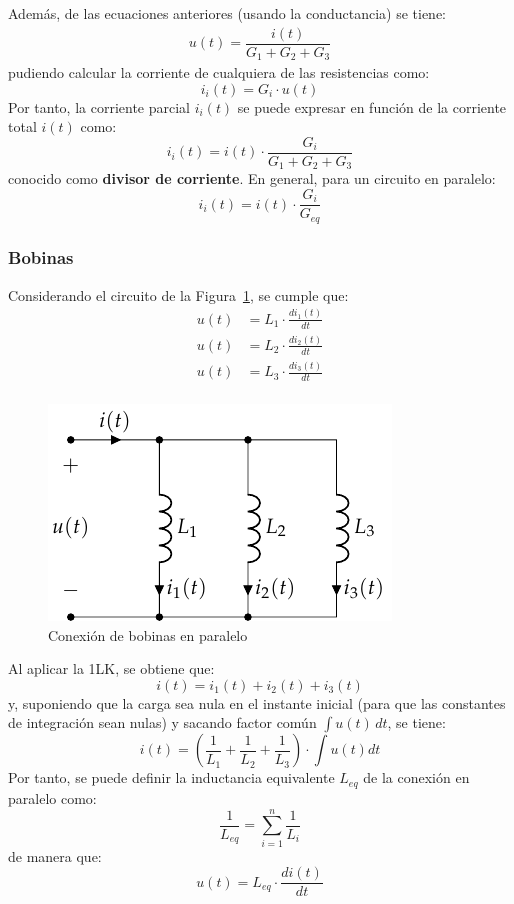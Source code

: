 		Además, de las ecuaciones anteriores (usando la conductancia) se tiene:
		\begin{align*}
			u(t) = \dfrac{i(t)}{G_1 + G_2 + G_3}
		\end{align*}
		pudiendo calcular la corriente de cualquiera de las resistencias como: 
		\begin{equation*}
			i_i(t) = G_i \cdot u(t)
		\end{equation*}
		Por tanto, la corriente parcial $i_i(t)$ se puede expresar en función de la corriente total $i(t)$ como: 
		\begin{equation*}
			i_i(t) = i(t) \cdot \dfrac{G_i}{G_1 + G_2 + G_3}
		\end{equation*}
		conocido como \textbf{divisor de corriente}. En general, para un circuito en paralelo:
		\begin{equation}
			\boxed{i_i(t) = i(t) \cdot \frac{G_i}{G_{eq}}}
		\end{equation}
		
		\subsubsection{Bobinas}
		
		Considerando el circuito de la Figura~\ref{fig.bobinas-paralelo}, se cumple que:
		\begin{align*}
			u(t) &= L_1 \cdot \frac{di_1(t)}{dt}\\
			u(t) &= L_2 \cdot \frac{di_2(t)}{dt}\\
			u(t) &= L_3 \cdot \frac{di_3(t)}{dt}\\
		\end{align*}
		\begin{figure}[H]
			\centering
			\includegraphics[width=0.35\linewidth]{../figs/BobinasParalelo.pdf}
			\caption{Conexión de bobinas en paralelo}
			\label{fig.bobinas-paralelo}
		\end{figure}
		Al aplicar la 1LK, se obtiene que: 
		\begin{equation*}
			i(t) = i_1(t) + i_2(t) + i_3(t)
		\end{equation*}
		y, suponiendo que la carga sea nula en el instante inicial (para que las constantes de integración sean nulas) y sacando factor común $\int u(t)\,dt$, se tiene:
		\begin{equation*}
			i(t)=\left(\dfrac{1}{L_1}+\dfrac{1}{L_2}+\dfrac{1}{L_3} \right)\cdot \int u(t) dt
		\end{equation*}
		Por tanto, se puede definir la inductancia equivalente $L_{eq}$ de la conexión en paralelo como:
		\begin{equation}
			\boxed{\dfrac{1}{L_{eq}} = \sum_{i = 1}^n \dfrac{1}{L_i}}
		\end{equation}
		de manera que:
		\begin{equation*}
			u(t) = L_{eq} \cdot \dfrac{di(t)}{dt}
		\end{equation*}
